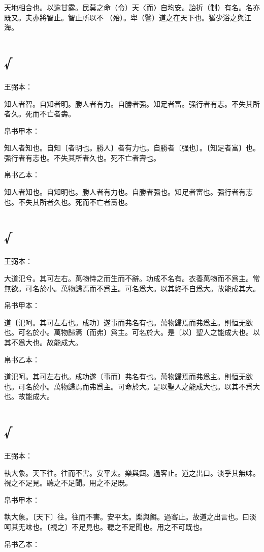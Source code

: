 \documentclass[a5paper]{ctexbook}
\begin{document}
    天地相合也。以逾甘露。民莫之命（令）天〈而〉自均安。詒折（制）有名。名亦既又。夫亦將智止。智止所以不󶴪（殆）。卑（譬）道之在天下也。猶少浴之與江海。

    \chapter{√}
    王弼本：

    知人者智。自知者明。勝人者有力。自勝者强。知足者富。强行者有志。不失其所者久。死而不亡者壽。

    
    帛书甲本：

    知人者知也。自知〔者明也。勝人〕者有力也。自勝者〔强也〕。〔知足者富〕也。强行者有志也。不失其所者久也。死不亡者壽也。

    帛书乙本：

    知人者知也。自知明也。勝人者有力也。自勝者强也。知足者富也。强行者有志也。不失其所者久也。死而不亡者壽也。

    \chapter{√}
    王弼本：

    大道氾兮。其可左右。萬物恃之而生而不辭。功成不名有。衣養萬物而不爲主。常無欲。可名於小。萬物歸焉而不爲主。可名爲大。以其終不自爲大。故能成其大。

    
    帛书甲本：

    道〔氾呵。其可左右也。成功〕遂事而弗名有也。萬物歸焉而弗爲主。則恒无欲也。可名於小。萬物歸焉〔而弗〕爲主。可名於大。是〔以〕聖人之能成大也。以其不爲大也。故能成大。

    帛书乙本：

    道氾呵。其可左右也。成功遂〔事而〕弗名有也。萬物歸焉而弗爲主。則恒无欲也。可名於小。萬物歸焉而弗爲主。可命於大。是以聖人之能成大也。以其不爲大也。故能成大。

    \chapter{√}
    王弼本：

    執大象。天下往。往而不害。安平太。樂與餌。過客止。道之出口。淡乎其無味。視之不足見。聽之不足聞。用之不足既。

    
    帛书甲本：

    執大象。〔天下〕往。往而不害。安平太。樂與餌。過客止。故道之出言也。曰淡呵其无味也。〔視之〕不足見也。聽之不足聞也。用之不可既也。

    帛书乙本：
\end{document}
